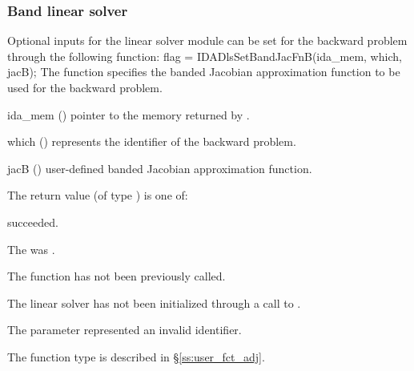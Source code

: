 \subsubsection{Band linear solver}
Optional inputs for the {\idaband} linear solver module can be set for the backward
problem through the following function:
{
  flag = IDADlsSetBandJacFnB(ida\_mem, which, jacB);
}
{
  The function  specifies the banded Jacobian
  approximation function to be used for the backward problem.
}
{
  \begin{args}
  \item[ida\_mem] ()
    pointer to the {\idas} memory returned by .
  \item[which] ()
    represents the identifier of the backward problem.
  \item[jacB] ()
    user-defined banded Jacobian approximation function.
  \end{args}
}
{
  The return value  (of type ) is one of:
  \begin{args}
  \item[\Id{IDADIRECT\_SUCCESS}] 
     succeeded.
  \item[\Id{IDADIRECT\_MEM\_NULL}]
    The  was .
  \item[\Id{IDADIRECT\_NO\_ADJ}]
    The function  has not been previously called.
  \item[\Id{IDADIRECT\_LMEM\_NULL}]
    The {\idadense} linear solver has not been initialized through a call to .
  \item[\Id{IDADIRECT\_ILL\_INPUT}]
    The parameter  represented an invalid identifier.
  \end{args}
}
{
  The function type  is described in \S\ref{ss:user_fct_adj}.
}

